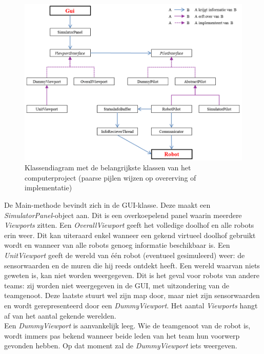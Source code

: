 \documentclass[tt3]{penoverslag}
\begin{document}
\begin{figure}
\centering
		\includegraphics[width=\textwidth]{KlasSoftware}
\caption[Klassendiagram computerproject]{Klassendiagram met de belangrijkste klassen van het computerproject (paarse pijlen wijzen op overerving of implementatie)}
\label{fig:klasSoft}
\end{figure}

De Main-methode bevindt zich in de GUI-klasse. Deze maakt een \textit{SimulatorPanel}-object aan. Dit is een overkoepelend panel waarin meerdere \textit{Viewports} zitten. Een \textit{OverallViewport} geeft het volledige doolhof en alle robots erin weer. Dit kan uiteraard enkel wanneer een gekend virtueel doolhof gebruikt wordt en wanneer van alle robots genoeg informatie beschikbaar is. Een \textit{UnitViewport} geeft de wereld van \'e\'en robot (eventueel gesimuleerd) weer: de sensorwaarden en de muren die hij reeds ontdekt heeft. Een wereld waarvan niets geweten is, kan niet worden weergegeven. Dit is het geval voor robots van andere teams: zij worden niet weergegeven in de GUI, met uitzondering van de teamgenoot. Deze laatste stuurt wel zijn map door, maar niet zijn sensorwaarden en wordt gerepresenteerd door een \textit{DummyViewport}. Het aantal \textit{Viewports} hangt af van het aantal gekende werelden.\\

Een \textit{DummyViewport} is aanvankelijk leeg. Wie de teamgenoot van de robot is, wordt immers pas bekend wanneer beide leden van het team hun voorwerp gevonden hebben. Op dat moment zal de \textit{DummyViewport} iets weergeven.\\
\end{document}
